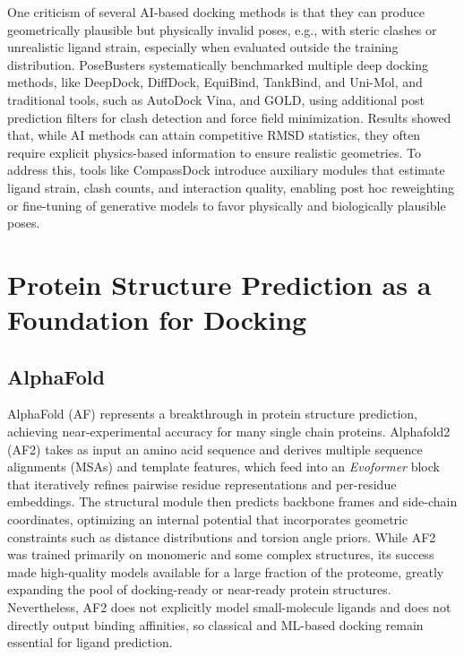\documentclass[12pt]{article}
\begin{document}
One criticism of several AI-based docking methods is that they can produce geometrically plausible but physically invalid poses, e.g., with steric clashes or unrealistic ligand strain, especially when evaluated outside the training distribution.\cite{CH13_posebusters2023} PoseBusters systematically benchmarked multiple deep docking methods, like DeepDock, DiffDock, EquiBind, TankBind, and Uni-Mol, and traditional tools, such as AutoDock Vina, and GOLD, using additional post prediction filters for clash detection and force field minimization.\cite{CH13_posebusters2023} Results showed that, while AI methods can attain competitive RMSD statistics, they often require explicit physics-based information to ensure realistic geometries. To address this, tools like CompassDock\cite{CH13_compassdock2024} introduce auxiliary modules that estimate ligand strain, clash counts, and interaction quality, enabling post hoc reweighting or fine-tuning of generative models to favor physically and biologically plausible poses.


\section{Protein Structure Prediction as a Foundation for Docking}

\subsection{AlphaFold}

AlphaFold (AF) represents a breakthrough in protein structure prediction, achieving near-experimental accuracy for many single chain proteins.\cite{CH13_jumper2021alphafold} Alphafold2 (AF2) takes as input an amino acid sequence and derives multiple sequence alignments (MSAs) and template features, which feed into an \emph{Evoformer} block that iteratively refines pairwise residue representations and per-residue embeddings. The structural module then predicts backbone frames and side-chain coordinates, optimizing an internal potential that incorporates geometric constraints such as distance distributions and torsion angle priors.\cite{CH13_jumper2021alphafold,CH13_alphafoldreview2021} While AF2 was trained primarily on monomeric and some complex structures, its success made high-quality models available for a large fraction of the proteome, greatly expanding the pool of docking-ready or near-ready protein structures.\cite{CH13_humanproteome2021,CH13_alphafoldimpact2022} Nevertheless, AF2 does not explicitly model small-molecule ligands and does not directly output binding affinities, so classical and ML-based docking remain essential for ligand prediction.
\end{document}
